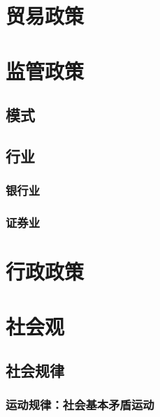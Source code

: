 \documentclass[12pt]{book}
\begin{document}
\chapter{贸易政策}



\chapter{监管政策}


\section{模式}



\section{行业}


\subsection{银行业}



\subsection{证券业}


\chapter{行政政策}








\chapter{社会观}





\section{社会规律}

\subsection{运动规律：社会基本矛盾运动}
\end{document}
